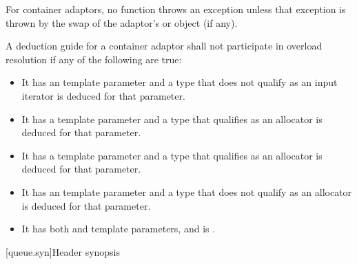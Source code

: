 \pnum
For container adaptors, no  function throws an exception unless that
exception is thrown by the swap of the adaptor's  or
 object (if any).

\pnum
A deduction guide for a container adaptor shall not participate in overload resolution if any of the following are true:
\begin{itemize}
\item It has an  template parameter and a type that does not qualify as an input iterator is deduced for that parameter.
\item It has a  template parameter and a type that qualifies as an allocator is deduced for that parameter.
\item It has a  template parameter and a type that qualifies as an allocator is deduced for that parameter.
\item It has an  template parameter and a type that does not qualify as an allocator is deduced for that parameter.
\item It has both  and  template parameters, and  is .
\end{itemize}

[queue.syn]{Header  synopsis}

